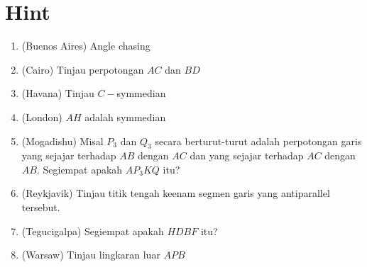 \documentclass[11pt]{scrartcl}
\begin{document}
\section{Hint}
\begin{enumerate}
    \item (Buenos Aires) Angle chasing
    \item (Cairo) Tinjau perpotongan $AC$ dan $BD$
    \item (Havana) Tinjau $C-$symmedian
    \item (London) $AH$ adalah symmedian
    \item (Mogadishu) Misal $P_3$ dan $Q_3$ secara berturut-turut adalah perpotongan garis yang sejajar terhadap $AB$ dengan $AC$ dan yang sejajar terhadap $AC$ dengan $AB$. Segiempat apakah $AP_3KQ$ itu?
    \item (Reykjavik) Tinjau titik tengah keenam segmen garis yang antiparallel tersebut.
    \item (Tegucigalpa) Segiempat apakah $HDBF$ itu?
    \item (Warsaw) Tinjau lingkaran luar $APB$
\end{enumerate}
\end{document}
